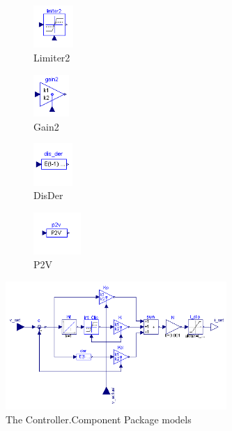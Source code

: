 \begin{figure}
	\vspace{0.5cm}
	\begin{subfigure}[htb]{0.11\textwidth}
	\centering
	\includegraphics[height=1.6cm]{images/limiter2.png}
	\caption{Limiter2}
	\label{fig:limiter2}
	\end{subfigure}
	\begin{subfigure}[htb]{0.11\textwidth}
	\centering
	\includegraphics[height=1.6cm]{images/gain2.png}
	\caption{Gain2}
	\label{fig:gain2}
	\end{subfigure}
	\begin{subfigure}[htb]{0.11\textwidth}
	\centering
	\includegraphics[height=1.6cm]{images/DisDer.png}
	\caption{DisDer}
	\label{fig:disder}
	\end{subfigure}
	\begin{subfigure}[htb]{0.11\textwidth}
	\centering
	\includegraphics[height=1.6cm]{images/p2v.png}
	\caption{P2V}
	\label{fig:p2v}
	\end{subfigure}
	\caption{The Controller.Component Package models}
	\label{fig:model-components}
	\includegraphics[width=8.4cm]{images/VelocityPID}

\end{figure}
